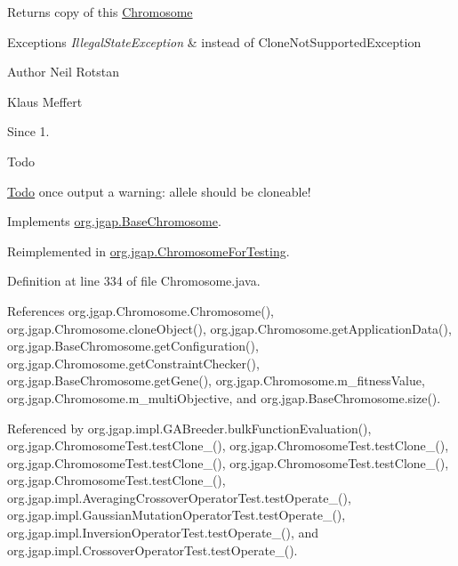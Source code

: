 \begin{DoxyReturn}{Returns}
copy of this \hyperlink{classorg_1_1jgap_1_1_chromosome}{Chromosome} 
\end{DoxyReturn}

\begin{DoxyExceptions}{Exceptions}
{\em Illegal\-State\-Exception} & instead of Clone\-Not\-Supported\-Exception\\
\hline
\end{DoxyExceptions}
\begin{DoxyAuthor}{Author}
Neil Rotstan 

Klaus Meffert 
\end{DoxyAuthor}
\begin{DoxySince}{Since}
1. 
\end{DoxySince}
\begin{DoxyRefDesc}{Todo}
\item[\hyperlink{todo__todo000049}{Todo}]once output a warning\-: allele should be cloneable! \end{DoxyRefDesc}


Implements \hyperlink{classorg_1_1jgap_1_1_base_chromosome_a97071ef6dba552c1c1f2b2780d27eec3}{org.\-jgap.\-Base\-Chromosome}.



Reimplemented in \hyperlink{classorg_1_1jgap_1_1_chromosome_for_testing_acfcef639c3443fde7d324164050e3e19}{org.\-jgap.\-Chromosome\-For\-Testing}.



Definition at line 334 of file Chromosome.\-java.



References org.\-jgap.\-Chromosome.\-Chromosome(), org.\-jgap.\-Chromosome.\-clone\-Object(), org.\-jgap.\-Chromosome.\-get\-Application\-Data(), org.\-jgap.\-Base\-Chromosome.\-get\-Configuration(), org.\-jgap.\-Chromosome.\-get\-Constraint\-Checker(), org.\-jgap.\-Base\-Chromosome.\-get\-Gene(), org.\-jgap.\-Chromosome.\-m\-\_\-fitness\-Value, org.\-jgap.\-Chromosome.\-m\-\_\-multi\-Objective, and org.\-jgap.\-Base\-Chromosome.\-size().



Referenced by org.\-jgap.\-impl.\-G\-A\-Breeder.\-bulk\-Function\-Evaluation(), org.\-jgap.\-Chromosome\-Test.\-test\-Clone\-\_(), org.\-jgap.\-Chromosome\-Test.\-test\-Clone\-\_(), org.\-jgap.\-Chromosome\-Test.\-test\-Clone\-\_(), org.\-jgap.\-Chromosome\-Test.\-test\-Clone\-\_(), org.\-jgap.\-Chromosome\-Test.\-test\-Clone\-\_(), org.\-jgap.\-impl.\-Averaging\-Crossover\-Operator\-Test.\-test\-Operate\-\_(), org.\-jgap.\-impl.\-Gaussian\-Mutation\-Operator\-Test.\-test\-Operate\-\_(), org.\-jgap.\-impl.\-Inversion\-Operator\-Test.\-test\-Operate\-\_(), and org.\-jgap.\-impl.\-Crossover\-Operator\-Test.\-test\-Operate\-\_().




